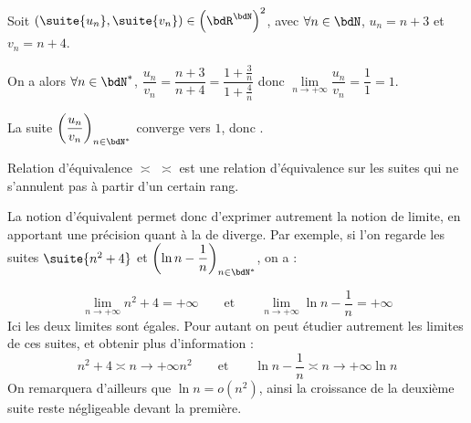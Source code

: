 \documentclass[a4paper,french,bookmarks]{article}
\begin{document}
\begin{example}{}{}
    Soit $\left(\suite{u_n}, \suite{v_n}\right) \in \left(\bdR^\bdN\right)^2$, avec $\forall n \in \bdN$, $u_n = n + 3$ et $v_n = n + 4$.
    
    On a alors $\forall n \in \bdN^*$, $\dfrac{u_n}{v_n} = \dfrac{n+3}{n+4} = \dfrac{1+\frac{3}{n}}{1+\frac{4}{n}}$ donc $\lim\limits_{n \to + \infty} \dfrac{u_n}{v_n} = \dfrac{1}{1}=1$.
    
    La suite $\left(\dfrac{u_n}{v_n}\right)_{n \in \bdN^*}$ converge vers $1$, donc .
\end{example}

\begin{property}{Relation d'équivalence $\asymp$}{}
    $\asymp$ est une relation d'équivalence sur les suites qui ne s'annulent pas à partir d'un certain rang.
\end{property}


La notion d'équivalent permet donc d'exprimer autrement la notion de limite, en apportant une précision quant à la  de diverge. Par exemple, si l'on regarde les suites $\suite{n^2+4}$ et $\left(\ln{n} - \dfrac{1}{n}\right)_{n \in \bdN^*}$, on a :

\[\lim\limits_{n \to +\infty} n^2 + 4 = +\infty \qquad \text{et} \qquad \lim\limits_{n \to +\infty} \ln{n} - \dfrac{1}{n} = +\infty\]
Ici les deux limites sont égales. Pour autant on peut étudier autrement les limites de ces suites, et obtenir plus d'information :
\[n^2 + 4 \asymp{n \to +\infty} n^2  \qquad \text{et} \qquad \ln{n} - \dfrac{1}{n} \asymp{n \to +\infty} \ln{n}\]
On remarquera d'ailleurs que $\ln n = o(n^2)$, ainsi la croissance de la deuxième suite reste négligeable devant la première.
\end{document}
